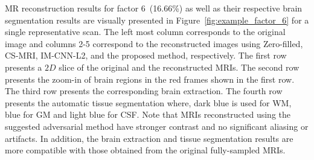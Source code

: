 \documentclass[10pt,journal,compsoc]{IEEEtran}
\begin{document}
MR reconstruction results for factor 6~(16.66\%) as well as their respective brain segmentation results are visually presented in Figure~\ref{fig:example_factor_6} for a single representative scan. The left most column corresponds to the original image and columns 2-5 correspond to the reconstructed images using Zero-filled, CS-MRI, IM-CNN-L2, and the proposed method, respectively. The first row presents a $2D$ slice of the original and the reconstructed MRIs. The second row presents the zoom-in of brain regions in the red frames shown in the first row. The third row presents the corresponding brain extraction. The fourth row presents the automatic tissue segmentation where, dark blue is used for WM, blue for GM and light blue for CSF. Note that MRIs reconstructed using the suggested adversarial method have stronger contrast and no significant aliasing or artifacts. In addition, the brain extraction and tissue segmentation results are more compatible with those obtained from the original fully-sampled MRIs. 
\end{document}
